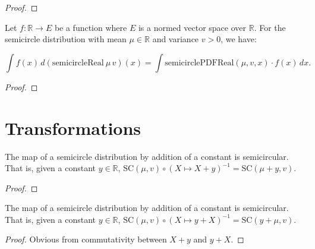 \begin{proof}
  \leanok
\end{proof}

\begin{lemma}
    \label{lemma:integral_semicircleReal_eq_integral_smul}
    \leanok

    Let $ f : \mathbb{R} \to E $ be a function where $ E $ is a normed vector space over $\mathbb{R}$. For the semicircle distribution with mean $\mu \in \mathbb{R}$ and variance $ v > 0 $, we have:

    \[
    \int f(x) \, d(\mathrm{semicircleReal}\ \mu\, v)(x) = \int \mathrm{semicirclePDFReal}(\mu, v, x) \cdot f(x) \, dx.
    \]
    
    
\end{lemma}

\begin{proof}
  \leanok
\end{proof}



\section{Transformations}




\begin{lemma}\label{lem:semicircleReal_map_add_const}
  \notready
  The map of a semicircle distribution by addition of a constant is semicircular. That is,
  given a constant $y \in \mathbb{R}$, $ \mathrm{SC}(\mu, v) \circ (X \mapsto X + y )^{-1} = \mathrm{SC}(\mu + y, v)$.
  \begin{proof}
  \end{proof}
\end{lemma}


\begin{lemma}\label{lem:semicircleReal_map_const_add}
  \mathlibok
  The map of a semicircle distribution by addition of a constant is semicircular. That is,
  given a constant $y \in \mathbb{R}$, $ \mathrm{SC}(\mu, v) \circ (X \mapsto y + X )^{-1} = \mathrm{SC}(y + \mu, v)$.
  \begin{proof}
    Obvious from commutativity between $X + y$ and $y + X$.
  \end{proof}
\end{lemma}


